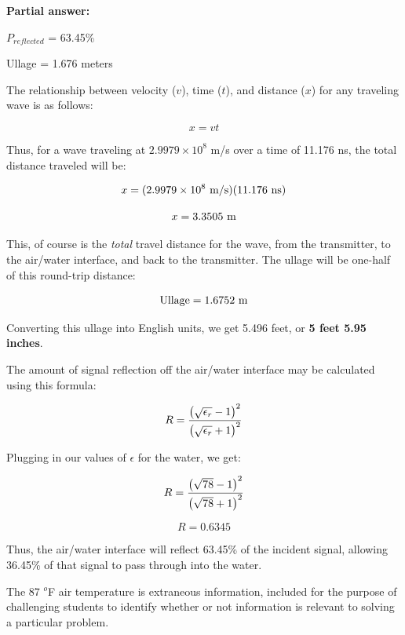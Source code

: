 





\noindent
{\bf Partial answer:}

\vskip 10pt

$P_{reflected}$ = 63.45\%

\vskip 10pt

Ullage = 1.676 meters







The relationship between velocity ($v$), time ($t$), and distance ($x$) for any traveling wave is as follows:

$$x = vt$$

Thus, for a wave traveling at $2.9979 \times 10^8$ m/s over a time of 11.176 ns, the total distance traveled will be:

$$x = (2.9979 \times 10^8 \hbox{ m/s})(11.176 \hbox{ ns})$$

$$x = 3.3505 \hbox{ m}$$

This, of course is the {\it total} travel distance for the wave, from the transmitter, to the air/water interface, and back to the transmitter.  The ullage will be one-half of this round-trip distance:

$$\hbox{Ullage} = 1.6752 \hbox{ m}$$

Converting this ullage into English units, we get 5.496 feet, or {\bf 5 feet 5.95 inches}.

\vskip 10pt

The amount of signal reflection off the air/water interface may be calculated using this formula:

$$R = {\left({\sqrt{\epsilon_{r}} - 1}\right)^2 \over \left(\sqrt{\epsilon_{r}} + 1 \right)^2}$$

Plugging in our values of $\epsilon$ for the water, we get:

$$R = {\left({\sqrt{78} - 1}\right)^2 \over \left(\sqrt{78} + 1 \right)^2}$$

$$R = 0.6345$$

Thus, the air/water interface will reflect 63.45\% of the incident signal, allowing 36.45\% of that signal to pass through into the water.

\vskip 10pt

The 87 $^{o}$F air temperature is extraneous information, included for the purpose of challenging students to identify whether or not information is relevant to solving a particular problem.




